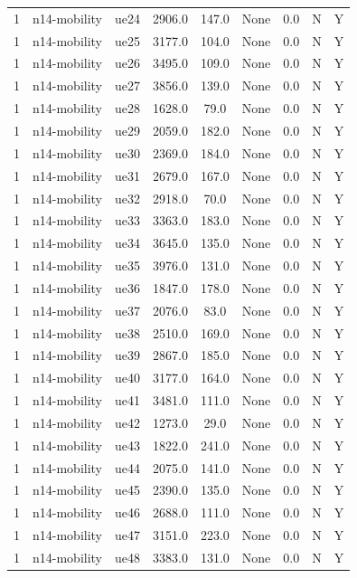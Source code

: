 \begin{table}[ht]
\begin{tabular}{|c|c|c|c|c|c|c|c|c|}
1 & n14-mobility & ue24 & 2906.0 & 147.0 & None & 0.0 & N & Y \\
1 & n14-mobility & ue25 & 3177.0 & 104.0 & None & 0.0 & N & Y \\
1 & n14-mobility & ue26 & 3495.0 & 109.0 & None & 0.0 & N & Y \\
1 & n14-mobility & ue27 & 3856.0 & 139.0 & None & 0.0 & N & Y \\
1 & n14-mobility & ue28 & 1628.0 & 79.0 & None & 0.0 & N & Y \\
1 & n14-mobility & ue29 & 2059.0 & 182.0 & None & 0.0 & N & Y \\
1 & n14-mobility & ue30 & 2369.0 & 184.0 & None & 0.0 & N & Y \\
1 & n14-mobility & ue31 & 2679.0 & 167.0 & None & 0.0 & N & Y \\
1 & n14-mobility & ue32 & 2918.0 & 70.0 & None & 0.0 & N & Y \\
1 & n14-mobility & ue33 & 3363.0 & 183.0 & None & 0.0 & N & Y \\
1 & n14-mobility & ue34 & 3645.0 & 135.0 & None & 0.0 & N & Y \\
1 & n14-mobility & ue35 & 3976.0 & 131.0 & None & 0.0 & N & Y \\
1 & n14-mobility & ue36 & 1847.0 & 178.0 & None & 0.0 & N & Y \\
1 & n14-mobility & ue37 & 2076.0 & 83.0 & None & 0.0 & N & Y \\
1 & n14-mobility & ue38 & 2510.0 & 169.0 & None & 0.0 & N & Y \\
1 & n14-mobility & ue39 & 2867.0 & 185.0 & None & 0.0 & N & Y \\
1 & n14-mobility & ue40 & 3177.0 & 164.0 & None & 0.0 & N & Y \\
1 & n14-mobility & ue41 & 3481.0 & 111.0 & None & 0.0 & N & Y \\
1 & n14-mobility & ue42 & 1273.0 & 29.0 & None & 0.0 & N & Y \\
1 & n14-mobility & ue43 & 1822.0 & 241.0 & None & 0.0 & N & Y \\
1 & n14-mobility & ue44 & 2075.0 & 141.0 & None & 0.0 & N & Y \\
1 & n14-mobility & ue45 & 2390.0 & 135.0 & None & 0.0 & N & Y \\
1 & n14-mobility & ue46 & 2688.0 & 111.0 & None & 0.0 & N & Y \\
1 & n14-mobility & ue47 & 3151.0 & 223.0 & None & 0.0 & N & Y \\
1 & n14-mobility & ue48 & 3383.0 & 131.0 & None & 0.0 & N & Y \\

\end{tabular}
\end{table}
